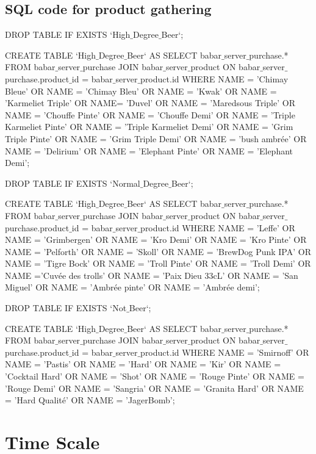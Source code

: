 \documentclass{report}
\begin{document}
\subsection{SQL code for product gathering}

DROP TABLE IF EXISTS `High$\_$Degree$\_$Beer`;

CREATE TABLE `High$\_$Degree$\_$Beer`
	AS SELECT babar$\_$server$\_$purchase.* FROM babar$\_$server$\_$purchase JOIN babar$\_$server$\_$product ON babar$\_$server$\_$purchase.product$\_$id = babar$\_$server$\_$product.id WHERE
	NAME = 'Chimay Bleue' OR NAME = 'Chimay Bleu' OR NAME = 'Kwak' OR NAME = 'Karmeliet Triple' OR NAME= 'Duvel' OR NAME = 'Maredsous Triple'
	OR NAME = 'Chouffe Pinte' OR NAME = 'Chouffe Demi'  OR NAME = 'Triple Karmeliet Pinte' OR NAME = 'Triple Karmeliet Demi'  OR NAME = 'Grim Triple Pinte'
	OR NAME = 'Grim Triple Demi' OR NAME = 'bush ambrée' OR NAME = 'Delirium' OR NAME = 'Elephant Pinte' OR NAME = 'Elephant Demi';



DROP TABLE IF EXISTS `Normal$\_$Degree$\_$Beer`;

CREATE TABLE `High$\_$Degree$\_$Beer`
	AS SELECT babar$\_$server$\_$purchase.* FROM babar$\_$server$\_$purchase JOIN babar$\_$server$\_$product ON babar$\_$server$\_$purchase.product$\_$id = babar$\_$server$\_$product.id WHERE
	NAME = 'Leffe' OR NAME = 'Grimbergen' OR NAME = 'Kro Demi' OR NAME = 'Kro Pinte' OR NAME = 'Pelforth' OR NAME = 'Skoll' OR NAME = 'BrewDog Punk IPA'
	OR NAME = 'Tigre Bock' OR NAME = 'Troll Pinte' OR NAME = 'Troll Demi' OR NAME ='Cuvée des trolls' OR NAME = 'Paix Dieu 33cL' OR NAME = 'San Miguel'
	OR NAME = 'Ambrée pinte' OR NAME = 'Ambrée demi';



DROP TABLE IF EXISTS `Not$\_$Beer`;

CREATE TABLE `High$\_$Degree$\_$Beer`
	AS SELECT babar$\_$server$\_$purchase.* FROM babar$\_$server$\_$purchase JOIN babar$\_$server$\_$product ON babar$\_$server$\_$purchase.product$\_$id = babar$\_$server$\_$product.id WHERE
	NAME = 'Smirnoff' OR NAME = 'Pastis' OR NAME = 'Hard' OR NAME = 'Kir' OR NAME = 'Cocktail Hard' OR NAME = 'Shot' OR NAME = 'Rouge Pinte' OR NAME = 'Rouge Demi'
	OR NAME = 'Sangria' OR NAME = 'Granita Hard' OR NAME = 'Hard Qualité' OR NAME  = 'JagerBomb';


\section{Time Scale}
\end{document}
